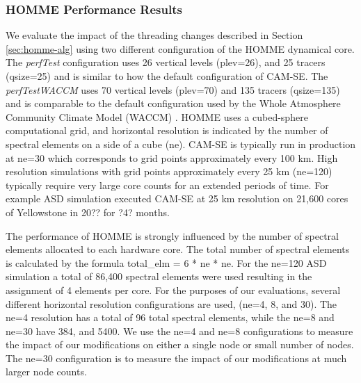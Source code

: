 \subsubsection{HOMME Performance Results}\label{sec:homme-results}

We evaluate the impact of the threading changes described in Section \ref{sec:homme-alg} using two different configuration of the HOMME dynamical core.  The {\em perfTest} configuration uses 26 vertical levels (plev=26), and 25 tracers (qsize=25) and is similar to how the default configuration of CAM-SE.  The {\em perfTestWACCM} uses 70 vertical levels (plev=70) and 135 tracers (qsize=135) and is comparable to the default configuration used by the Whole Atmosphere Community Climate Model (WACCM) \cite{waccm}.  HOMME uses a cubed-sphere computational grid, and horizontal resolution is indicated by the number of spectral elements on a side of a cube (ne). CAM-SE is typically run in production at ne=30 which corresponds to grid points approximately every 100 km.  High resolution simulations with grid points approximately every 25 km (ne=120) typically require very large core counts for an extended periods of time.   For example ASD simulation \cite{asd} executed CAM-SE at 25 km resolution on 21,600 cores of Yellowstone in 20?? for ?4? months.

The performance of HOMME is strongly influenced by the number of spectral elements allocated to each hardware core.  The total number of spectral elements is calculated by the formula total\_elm = 6 * ne  * ne.  For the ne=120 ASD simulation a total of 86,400 spectral elements were used resulting in the assignment of 4 elements per core. For the purposes of our evaluations, several different horizontal resolution configurations are used, (ne=4, 8, and 30). The ne=4 resolution has a total of 96 total spectral elements, while the ne=8 and ne=30 have 384, and 5400.  We use the ne=4 and ne=8 configurations to measure the impact of our modifications on either a single node or small number of nodes.  The ne=30 configuration is to measure the impact of our modifications at much larger node counts.  


